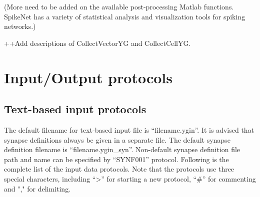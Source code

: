 \documentclass{article}
\begin{document}
(More need to be added on the available post-processing Matlab functions. SpikeNet has a variety of statistical analysis and visualization tools for spiking networks.)

++Add  descriptions of CollectVectorYG and CollectCellYG.

\section{Input/Output protocols}
\label{sec:IO protocols}
\subsection{Text-based input protocols}
The default filename for text-based input file is ``filename.ygin''.
It is advised that synapse definitions always be given in a separate file.
The default synapse definition filename is ``filename.ygin\_syn''.
Non-default synapse definition file path and name can be specified by ``SYNF001'' protocol.
Following is the complete list of the input data protocols.
Note that the protocols use three special characters, including ``\textgreater'' for starting a new protocol, ``\#'' for commenting and "," for delimiting.

\end{document}

